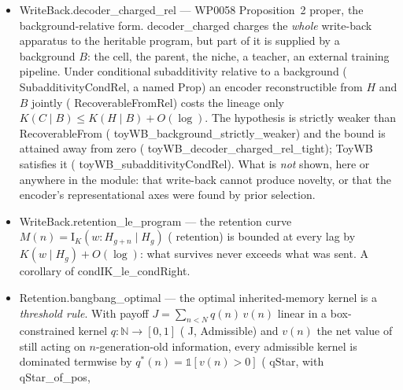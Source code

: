 \documentclass[11pt,a4paper]{article}
\newcommand{\lean}[1]{{\ttfamily\small
  \let\leanunderscore\_\def\_{\leanunderscore\allowbreak}#1}}
\newcommand{\Ik}{\mathrm{I}_K}
\begin{document}
\begin{itemize}[leftmargin=1.4em,itemsep=1pt]
zeroth-order): that bound is the substantive half. In the Lamarckian regime
$\lambda_B \le K(w\mid H,\sigma)+O(\log)$ (\lean{lamarckian\_bandwidth\_le\_decoder\_image}, first-order) --- immediate, since $\lambda_B$ is \emph{defined} on $w$.
\lean{toyWB\_writeback\_zero\_but\_total\_positive} machine-checks that the two quantities genuinely differ:
a witness with $\lambda_B=0$ and total $=3$. Also \lean{decoder\_charged} ($K(C)\le K(H)+O(\log)$, Prop.~2's background-free form) and
\lean{trivial\_decoder\_transmits\_nothing} (Corollary~1: a trivial write-back program transmits
nothing however much was acquired). Witness \lean{ToyWB} satisfies both named AIT hypotheses \emph{and
attains} the Darwinian bound (\lean{toyWB\_selection\_bound\_tight}) --- the corollaries are tight,
not merely non-vacuous.
\item \lean{WriteBack.decoder\_charged\_rel} --- WP0058 Proposition~2 proper, the background-relative form.
\lean{decoder\_charged} charges the \emph{whole} write-back apparatus to the heritable program, but
part of it is supplied by a background $B$: the cell, the parent, the niche, a teacher, an external
training pipeline. Under conditional subadditivity relative to a background
(\lean{SubadditivityCondRel}, a named \lean{Prop}) an encoder reconstructible from $H$ and $B$
jointly (\lean{RecoverableFromRel}) costs the lineage only $K(C\mid B)\le K(H\mid B)+O(\log)$. The
hypothesis is strictly weaker than \lean{RecoverableFrom} (\lean{toyWB\_background\_strictly\_weaker})
and the bound is attained away from zero (\lean{toyWB\_decoder\_charged\_rel\_tight}); \lean{ToyWB}
satisfies it (\lean{toyWB\_subadditivityCondRel}). What is \emph{not} shown, here or anywhere in the
module: that write-back cannot produce novelty, or that the encoder's representational axes were
found by prior selection.
\item \lean{WriteBack.retention\_le\_program} --- the retention curve
$M(n)=\Ik(w:H_{g+n}\mid H_g)$ (\lean{retention}) is bounded at every lag by $K(w\mid H_g)+O(\log)$:
what survives never exceeds what was sent. A corollary of \lean{condIK\_le\_condRight}.
\item \lean{Retention.bangbang\_optimal} --- the optimal inherited-memory kernel is a
\emph{threshold rule}. With payoff $J=\sum_{n<N} q(n)\,v(n)$ linear in a box-constrained kernel
$q:\mathbb N\to[0,1]$ (\lean{J}, \lean{Admissible}) and $v(n)$ the net value of still acting on
$n$-generation-old information, every admissible kernel is dominated termwise by
$q^\ast(n)=\mathbb 1[v(n)>0]$ (\lean{qStar}, with \lean{qStar\_of\_pos},

\end{itemize}
\end{document}
